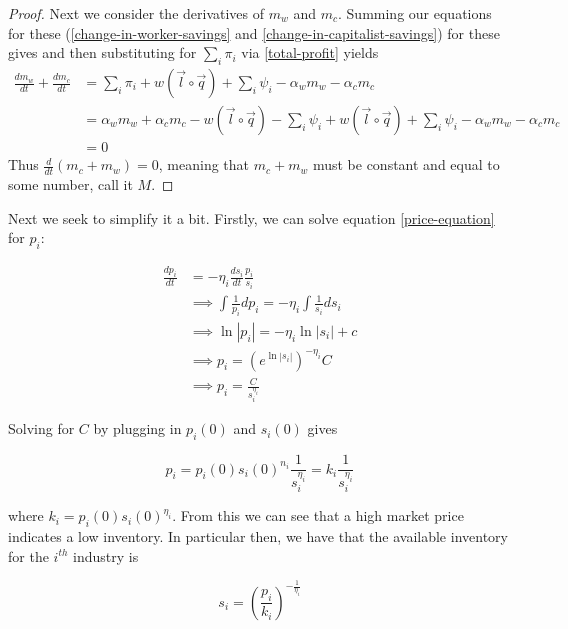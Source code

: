 \documentclass{article}
\theoremstyle{definition}
\begin{document}
\begin{proof}
    Next we consider the derivatives of $m_w$ and $m_c$. Summing our equations for these (\ref{change-in-worker-savings} and \ref{change-in-capitalist-savings}) for these gives and then substituting for $\sum_i \pi_i$ via \ref{total-profit} yields
    \begin{align}
        \frac{dm_w}{dt}+\frac{dm_c}{dt} &= \sum_i \pi_i +w(\vec{l}\circ\vec{q}) + \sum_i \psi_i -\alpha_wm_w - \alpha_cm_c \\
                                        &= \alpha_w m_w + \alpha_c m_c - w(\vec{l}\circ\vec{q}) - \sum_i \psi_i +w(\vec{l}\circ\vec{q})+\sum_i \psi_i -\alpha_wm_w -\alpha_cm_c \\
                                        &= 0
    \end{align}
    Thus $\frac{d}{dt}(m_c+m_w) = 0$, meaning that $m_c+m_w$ must be constant and equal to some number, call it $M$. 
\end{proof}

Next we seek to simplify it a bit. Firstly, we can solve equation \ref{price-equation} for $p_i$: 

\begin{align}
    \frac{dp_i}{dt} &= -\eta_i\frac{ds_i}{dt}\frac{p_i}{s_i} \\
                    &\implies \int \frac{1}{p_i}dp_i = -\eta_i \int \frac{1}{s_i}ds_i \\
                    &\implies \ln|p_i| = -\eta_i \ln|s_i|+c \\
                    &\implies p_i = \left( e^{\ln|s_i|} \right)^{-\eta_i}C \\
                    &\implies p_i = \frac{C}{s_i^{\eta_i}}
\end{align}

Solving for $C$ by plugging in $p_i(0)$ and $s_i(0)$ gives 

\begin{equation}
    p_i = p_i(0)s_i(0)^{n_i}\frac{1}{s_i^{\eta_i}} = k_i\frac{1}{s_i^{\eta_i}}
\end{equation}

where $k_i = p_i(0)s_i(0)^{\eta_i}$. From this we can see that a high market price indicates a low inventory. In particular then, we have that the available inventory for the $i^{th}$ industry is 

\begin{equation}
    s_i = \left( \frac{p_i}{k_i} \right)^{-\frac{1}{\eta_i}} \label{s-in-terms-of-p}
\end{equation}
\end{document}

